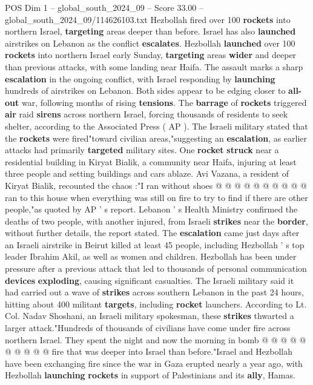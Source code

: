 \begin{textsample}{POS Dim 1 – global\_south\_2024\_09 – Score 33.00 – global\_south\_2024\_09/114626103.txt}  \label{ex:f1_pos_032}
Hezbollah fired over 100 \textbf{rockets} into northern Israel, \textbf{targeting} areas deeper than before.
Israel has also \textbf{launched} airstrikes on Lebanon as the conflict \textbf{escalates}.
Hezbollah \textbf{launched} over 100 \textbf{rockets} into northern Israel early Sunday, \textbf{targeting} areas \textbf{wider} and deeper than previous attacks, with some landing near Haifa.
The assault marks a sharp \textbf{escalation} in the ongoing conflict, with Israel responding by \textbf{launching} hundreds of airstrikes on Lebanon.
Both sides appear to be edging closer to \textbf{all-out} war, following months of rising \textbf{tensions}.
The \textbf{barrage} of \textbf{rockets} triggered \textbf{air} raid \textbf{sirens} across northern Israel, forcing thousands of residents to seek shelter, according to the Associated Press ( AP ).
The Israeli military stated that the \textbf{rockets} were fired"toward civilian areas,"suggesting an \textbf{escalation}, as earlier attacks had primarily \textbf{targeted} military sites.
One \textbf{rocket} \textbf{struck} near a residential building in Kiryat Bialik, a community near Haifa, injuring at least three people and setting buildings and cars ablaze.
Avi Vazana, a resident of Kiryat Bialik, recounted the chaos :"I ran without shoes @ @ @ @ @ @ @ @ @ @ ran to this house when everything was still on fire to try to find if there are other people,"as quoted by AP ' s report.
Lebanon ' s Health Ministry confirmed the deaths of two people, with another injured, from Israeli \textbf{strikes} near the \textbf{border}, without further details, the report stated.
The \textbf{escalation} came just days after an Israeli airstrike in Beirut killed at least 45 people, including Hezbollah ' s top leader Ibrahim Akil, as well as women and children.
Hezbollah has been under pressure after a previous attack that led to thousands of personal communication \textbf{devices} \textbf{exploding}, causing significant casualties.
The Israeli military said it had carried out a wave of \textbf{strikes} across southern Lebanon in the past 24 hours, hitting about 400 militant \textbf{targets}, including \textbf{rocket} launchers.
According to Lt.
Col.
Nadav Shoshani, an Israeli military spokesman, these \textbf{strikes} thwarted a larger attack."Hundreds of thousands of civilians have come under fire across northern Israel.
They spent the night and now the morning in bomb @ @ @ @ @ @ @ @ @ @ fire that was deeper into Israel than before."Israel and Hezbollah have been exchanging fire since the war in Gaza erupted nearly a year ago, with Hezbollah \textbf{launching} \textbf{rockets} in support of Palestinians and its \textbf{ally}, Hamas.

\end{textsample}
